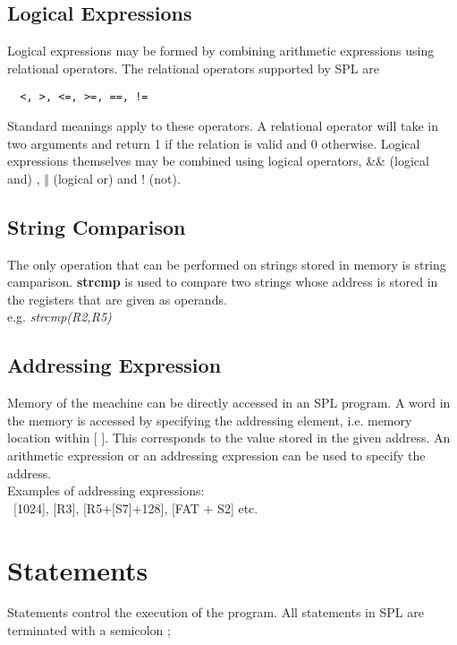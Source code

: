 \documentclass[11pt]{article}
\begin{document}
\subsection{Logical Expressions}

Logical expressions may be formed by combining arithmetic expressions using relational operators. The relational operators supported by SPL are \begin{verbatim}  <, >, <=, >=, ==, !=
\end{verbatim}
Standard  meanings apply to these operators. A relational operator will take in two arguments and return 1 if the relation is valid and 0 otherwise. Logical expressions themselves may be combined using logical operators, \&\& (logical and) ,  $\Vert$ (logical or) and ! (not).

\subsection{String Comparison}
The only operation that can be performed on strings stored in memory is string camparison. \textbf{strcmp} is used to compare two strings whose address is stored in the registers that are given as operands. \\

 e.g. \textit{strcmp(R2,R5)}


\subsection{Addressing Expression}
Memory of the meachine can be directly accessed in an SPL program. A word in the memory is accessed by specifying the addressing element, i.e. memory location within [ ]. This  corresponds to the value stored in the given address. An arithmetic expression or an addressing expression can be used to specify the address. \\

Examples of addressing expressions: \\\   
 [1024], [R3], [R5+[S7]+128], [FAT + S2] etc.

\section{Statements}

Statements control the execution of the program. All statements in SPL are terminated with a semicolon ;
\end{document}
